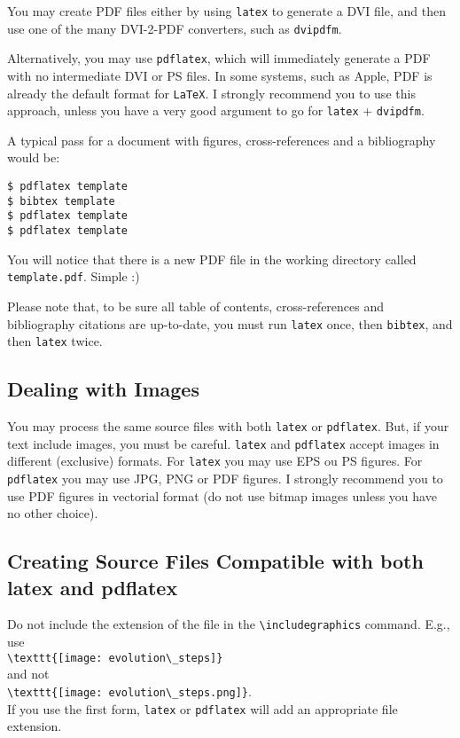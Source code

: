 You may create PDF files either by using \verb!latex! to generate a DVI file, and then use one of the many DVI-2-PDF converters, such as \verb!dvipdfm!.

Alternatively, you may use \verb!pdflatex!, which will immediately generate a PDF with no intermediate DVI or PS files. In some systems, such as Apple, PDF is already the default format for \texttt{LaTeX}. I strongly recommend you to use this approach, unless you have a very good argument to go for \verb!latex! + \verb!dvipdfm!.

A typical pass for a document with figures, cross-references and a bibliography would be:
\begin{verbatim}
$ pdflatex template
$ bibtex template
$ pdflatex template
$ pdflatex template
\end{verbatim}
You will notice that there is a new PDF file in the working directory called \verb!template.pdf!. Simple :)

Please note that, to be sure all table of contents, cross-references and bibliography citations are up-to-date, you must run \verb!latex! once, then \verb!bibtex!, and then \verb!latex! twice.

\subsection{Dealing with Images} %
\label{sub:dealing_with_images}

You may process the same source files with both \verb!latex! or \verb!pdflatex!. But, if your text include images, you must be careful. \verb!latex! and \verb!pdflatex! accept images in different (exclusive) formats.  For \verb!latex! you may use EPS ou PS figures. For \verb!pdflatex! you may use JPG, PNG or PDF figures.  I strongly recommend you to use PDF figures in vectorial format (do not use bitmap images unless you have no other choice).


\subsection{Creating Source Files Compatible with both latex and pdflatex} %
\label{ssec:creating_source_files_compatible_with_both_latex_and_pdflatex}

Do not include the extension of the file in the \verb!\includegraphics! command. E.g., use\\
\verb!\texttt{[image: evolution\_steps]}!\\
and not\\
\verb!\texttt{[image: evolution\_steps.png]}!.\\
If you use the first form, \verb!latex! or \verb!pdflatex! will add an appropriate file extension.

